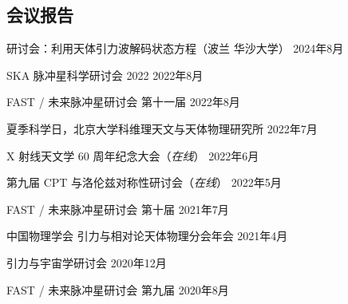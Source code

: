 \documentclass[margin,line]{res_mod}
\begin{document}
\begin{resume}
\section{\sc 会议报告}
\begin{etaremune}
  \item 研讨会：利用天体引力波解码状态方程（波兰 华沙大学） \hfill{} 2024年8月
  \item SKA 脉冲星科学研讨会 2022 \hfill{} 2022年8月
  \item FAST / 未来脉冲星研讨会 第十一届 \hfill{} 2022年8月
  \item 夏季科学日，北京大学科维理天文与天体物理研究所 \hfill{} 2022年7月
  \item X 射线天文学 60 周年纪念大会（{\it 在线}） \hfill{} 2022年6月
  \item 第九届 CPT 与洛伦兹对称性研讨会（{\it 在线}） \hfill{} 2022年5月
  \item FAST / 未来脉冲星研讨会 第十届 \hfill{} 2021年7月
  \item 中国物理学会 引力与相对论天体物理分会年会 \hfill{} 2021年4月
  \item 引力与宇宙学研讨会 \hfill{} 2020年12月
  \item FAST / 未来脉冲星研讨会 第九届 \hfill{} 2020年8月
\end{etaremune}



\newpage{}

\end{resume}
\end{document}
